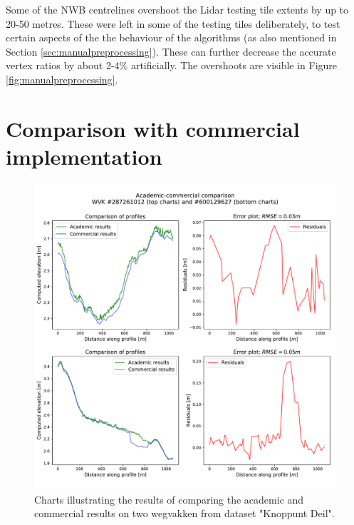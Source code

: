 Some of the NWB centrelines overshoot the Lidar testing tile extents by up to 20-50 metres. These were left in some of the testing tiles deliberately, to test certain aspects of the the behaviour of the algorithms (as also mentioned in Section \ref{sec:manualpreprocessing}). These can further decrease the accurate vertex ratios by about 2-4\% artificially. The overshoots are visible in Figure \ref{fig:manualpreprocessing}.

\section{Comparison with commercial implementation}
\label{sec:r_comparison}

\begin{figure}
    \centering
    \includegraphics[width=\linewidth]{final_report/figs/commercialcomparison0.pdf}
    \caption{Charts illustrating the results of comparing the academic and commercial results on two wegvakken from dataset "Knoppunt Deil".}
    \label{fig:commercialcomparison0}
\end{figure}

